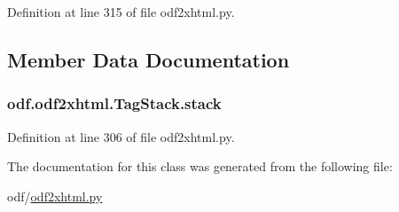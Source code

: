 Definition at line 315 of file odf2xhtml.\+py.



\subsection{Member Data Documentation}
\hypertarget{classodf_1_1odf2xhtml_1_1TagStack_a445684cfc8bfc9e2a6dd6800119d33fc}{
\subsubsection[{stack}]{\setlength{\rightskip}{0pt plus 5cm}odf.\+odf2xhtml.\+Tag\+Stack.\+stack}}\label{classodf_1_1odf2xhtml_1_1TagStack_a445684cfc8bfc9e2a6dd6800119d33fc}


Definition at line 306 of file odf2xhtml.\+py.



The documentation for this class was generated from the following file\+:\begin{DoxyCompactItemize}
\item 
odf/\hyperlink{odf2xhtml_8py}{odf2xhtml.\+py}\end{DoxyCompactItemize}
